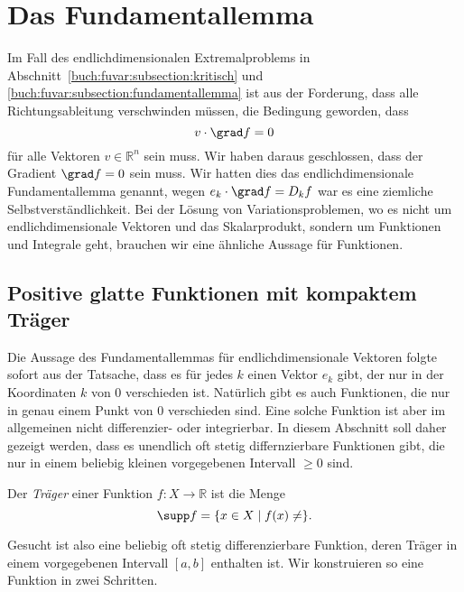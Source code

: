 %
%
%
\section{Das Fundamentallemma
\label{buch:variation:section:fundamentallemma}}
Im Fall des endlichdimensionalen Extremalproblems
in Abschnitt~\ref{buch:fuvar:subsection:kritisch}
und \ref{buch:fuvar:subsection:fundamentallemma}
ist aus der Forderung, dass alle Richtungsableitung verschwinden müssen, 
die Bedingung geworden, dass
\[
v\cdot\grad f = 0
\]
für alle Vektoren $v\in\mathbb{R}^n$ sein muss.
Wir haben daraus geschlossen, dass der Gradient $\grad f=0$
sein muss.
Wir hatten dies das endlichdimensionale Fundamentallemma genannt,
wegen $e_k\cdot \grad f = D_kf$ war es eine ziemliche Selbstverständlichkeit.
Bei der Lösung von Variationsproblemen, wo es nicht um endlichdimensionale
Vektoren und das Skalarprodukt, sondern um Funktionen und Integrale
geht, brauchen wir eine ähnliche Aussage für Funktionen.

%
%
\subsection{Positive glatte Funktionen mit kompaktem Träger
\label{buch:variation:fundamentallemma:subsection:positiv}}
Die Aussage des Fundamentallemmas für endlichdimensionale Vektoren 
folgte sofort aus der Tatsache, dass es für jedes $k$ einen Vektor
$e_k$ gibt, der nur in der Koordinaten $k$ von $0$ verschieden ist.
Natürlich gibt es auch Funktionen, die nur in genau einem Punkt
von $0$ verschieden sind.
Eine solche Funktion ist aber im allgemeinen nicht differenzier-
oder integrierbar.
In diesem Abschnitt soll daher gezeigt werden, dass es unendlich
oft stetig differnzierbare Funktionen gibt, die nur in einem beliebig
kleinen vorgegebenen Intervall $\ge 0$ sind.

\begin{definition}[Träger]
\label{buch:variation:def:traeger}
Der {\em Träger} einer Funktion $f\colon X\to\mathbb{R}$ ist die Menge
%
\[
\supp f = \{ x\in X\mid f(x)\ne \}.
\]
%
\end{definition}

Gesucht ist also eine beliebig oft stetig differenzierbare Funktion,
deren Träger in einem vorgegebenen Intervall $[a,b]$ enthalten ist.
Wir konstruieren so eine Funktion in zwei Schritten.

